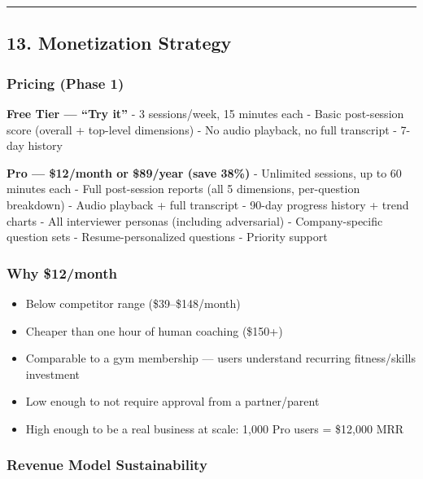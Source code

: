 \documentclass[
  11pt,
]{article}
\providecommand{\tightlist}{%
  \setlength{\itemsep}{0pt}\setlength{\parskip}{0pt}}
\begin{document}
\begin{center}\rule{0.5\linewidth}{0.5pt}\end{center}

\hypertarget{monetization-strategy}{%
\subsection{13. Monetization Strategy}\label{monetization-strategy}}

\hypertarget{pricing-phase-1}{%
\subsubsection{Pricing (Phase 1)}\label{pricing-phase-1}}

\textbf{Free Tier --- ``Try it''} - 3 sessions/week, 15 minutes each -
Basic post-session score (overall + top-level dimensions) - No audio
playback, no full transcript - 7-day history

\textbf{Pro --- \$12/month or \$89/year (save 38\%)} - Unlimited
sessions, up to 60 minutes each - Full post-session reports (all 5
dimensions, per-question breakdown) - Audio playback + full transcript -
90-day progress history + trend charts - All interviewer personas
(including adversarial) - Company-specific question sets -
Resume-personalized questions - Priority support

\hypertarget{why-12month}{%
\subsubsection{Why \$12/month}\label{why-12month}}

\begin{itemize}
\tightlist
\item
  Below competitor range (\$39--\$148/month)
\item
  Cheaper than one hour of human coaching (\$150+)
\item
  Comparable to a gym membership --- users understand recurring
  fitness/skills investment
\item
  Low enough to not require approval from a partner/parent
\item
  High enough to be a real business at scale: 1,000 Pro users = \$12,000
  MRR
\end{itemize}

\hypertarget{revenue-model-sustainability}{%
\subsubsection{Revenue Model
Sustainability}\label{revenue-model-sustainability}}
\end{document}
